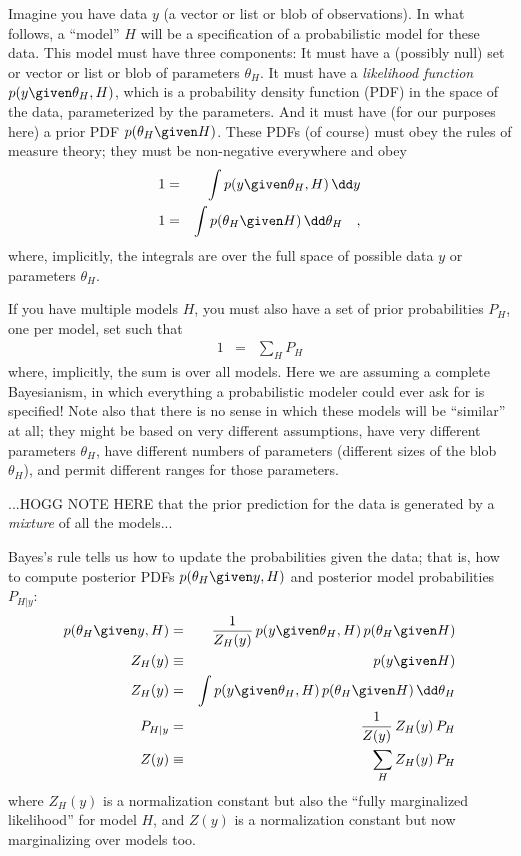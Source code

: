 \documentclass[12pt,twoside]{article}
\begin{document}
Imagine you have data $y$ (a vector or list or blob of observations).
In what follows, a ``model'' $H$ will be a specification of a probabilistic model for these data.
This model must have three components:
It must have a (possibly null) set or vector or list or blob of parameters $\theta_H$.
It must have a \emph{likelihood function} $p(y\given\theta_H,H)$, which is
  a probability density function (PDF) in the space of the data, parameterized by the parameters.
And it must have (for our purposes here) a prior PDF $p(\theta_H\given H)$.
These PDFs (of course) must obey the rules of measure theory;
  they must be non-negative everywhere and obey
\begin{eqnarray}
1 &=& \int p(y\given\theta_H,H)\,\dd y
\\
1 &=& \int p(\theta_H\given H)\,\dd \theta_H
\quad ,
\end{eqnarray}
where, implicitly,
the integrals are over the full space of possible data $y$ or parameters $\theta_H$.

If you have multiple models $H$,
  you must also have a set of prior probabilities $P_H$, one per model,
  set such that
\begin{eqnarray}
1 &=& \sum_H P_H
\end{eqnarray}
where, implicitly,
the sum is over all models.
Here we are assuming a complete Bayesianism,
  in which everything a probabilistic modeler could ever ask for is specified!
Note also that there is no sense in which these models will be ``similar'' at all;
  they might be based on very different assumptions,
  have very different parameters $\theta_H$,
  have different numbers of parameters (different sizes of the blob $\theta_H$),
  and permit different ranges for those parameters.

...HOGG NOTE HERE that the prior prediction for the data is generated by a \emph{mixture} of all the models...

Bayes's rule tells us how to update the probabilities given the data;
  that is, how to compute posterior PDFs $p(\theta_H\given y,H)$
  and posterior model probabilities $P_{H|y}$:
\begin{eqnarray}
p(\theta_H\given y,H) &=& \frac{1}{Z_H(y)}\,p(y\given\theta_H,H)\,p(\theta_H\given H)
\\
Z_H(y) &\equiv& p(y\given H)
\\
Z_H(y) &=& \int p(y\given\theta_H,H)\,p(\theta_H\given H)\,\dd\theta_H
\\
P_{H|y} &=& \frac{1}{Z(y)}\,Z_H(y)\,P_H
\\
Z(y) &\equiv& \sum_H Z_H(y)\,P_H
\end{eqnarray}
where
$Z_H(y)$ is a normalization constant
  but also the ``fully marginalized likelihood'' for model $H$, and
$Z(y)$ is a normalization constant but
  now marginalizing over models too.
\end{document}
